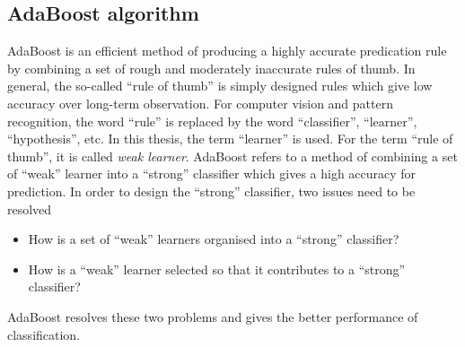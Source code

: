 \subsection{AdaBoost algorithm}
\label{sec:adaboostaglortihm}
AdaBoost is an efficient method of producing a highly accurate predication rule by combining a set of rough and moderately inaccurate rules of thumb. In general, the so-called ``rule of thumb'' is simply designed rules which give low accuracy over long-term observation. For computer vision and pattern recognition, the word ``rule'' is replaced by the word ``classifier'', ``learner'', ``hypothesis'', etc. In this thesis, the term ``learner'' is used.  For the term ``rule of thumb'', it is called \textit{weak learner}. AdaBoost refers to a method of combining a set of ``weak'' learner into a ``strong'' classifier which gives a high accuracy for prediction. In order to design the ``strong'' classifier, two issues need to be resolved
\begin{itemize}
 \item How is a set of ``weak'' learners organised into a ``strong'' classifier?
 \item How is a ``weak'' learner selected so that it contributes to a ``strong'' classifier?
\end{itemize}
AdaBoost resolves these two problems and gives the better performance of classification.

